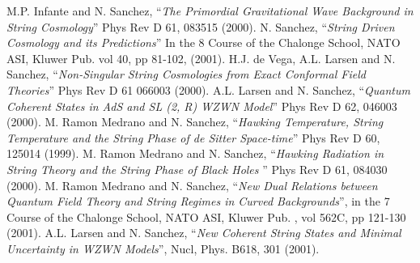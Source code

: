 \documentclass[12pt,a4paper]{article}
\begin{document}
\begin{thebibliography}{8}
 M.P. Infante and N. Sanchez, ``{\it The Primordial Gravitational Wave Background in String Cosmology}'' Phys Rev D 61, 083515 (2000).
 N. Sanchez, ``{\it String Driven Cosmology and its Predictions}''
In the 8\coordHE{} Course of the Chalonge School, NATO ASI, Kluwer Pub. vol 40, 
pp 81-102, (2001).
 H.J. de Vega, A.L. Larsen and N. Sanchez, ``{\it Non-Singular 
String Cosmologies from Exact Conformal Field Theories}'' Phys Rev D 61
066003 (2000).
 A.L. Larsen and N. Sanchez, ``{\it Quantum Coherent States in AdS and SL (2, R) WZWN Model}'' Phys Rev D 62, 046003 (2000).
 M. Ramon Medrano and N. Sanchez, ``{\it Hawking Temperature, 
String Temperature and the String Phase of de Sitter Space-time}'' Phys Rev 
D 60, 125014 (1999).
 M. Ramon Medrano and N. Sanchez, ``{\it Hawking Radiation in 
String Theory and the String Phase of Black Holes }'' Phys Rev D 61, 084030 
(2000).
 M. Ramon Medrano and N. Sanchez, ``{\it New Dual Relations 
between Quantum Field Theory and String Regimes in Curved Backgrounds}'', in 
the 7\coordHE{} Course of the Chalonge School, NATO ASI, Kluwer Pub. , vol 562C, 
pp 121-130 (2001).
 A.L. Larsen and N. Sanchez, ``{\it New Coherent String States and Minimal Uncertainty in WZWN Models}'', Nucl, Phys. B618, 301 (2001). 
\end{thebibliography}
\end{document}
